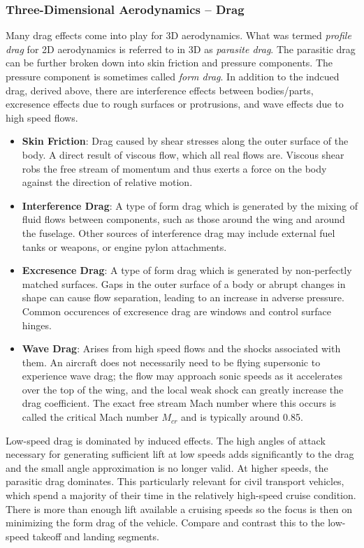 \documentclass[11pt]{article}
\newcommand{\Item}[1]{\item \textbf{#1}:}
\begin{document}
\subsubsection{Three-Dimensional Aerodynamics -- Drag}
Many drag effects come into play for 3D aerodynamics. What was termed \emph{profile drag} for 2D aerodynamics is referred to in 3D as \emph{parasite drag}. The parasitic drag can be further broken down into skin friction and pressure components. The pressure component is sometimes called \emph{form drag}. In addition to the indcued drag, derived above, there are interference effects between bodies/parts, excresence effects due to rough surfaces or protrusions, and wave effects due to high speed flows.
\begin{itemize}
\Item{Skin Friction} Drag caused by shear stresses along the outer surface of the body. A direct result of viscous flow, which all real flows are. Viscous shear robs the free stream of momentum and thus exerts a force on the body against the direction of relative motion.
\Item{Interference Drag} A type of form drag which is generated by the mixing of fluid flows between components, such as those around the wing and around the fuselage. Other sources of interference drag may include external fuel tanks or weapons, or engine pylon attachments.
\Item{Excresence Drag} A type of form drag which is generated by non-perfectly matched surfaces. Gaps in the outer surface of a body or abrupt changes in shape can cause flow separation, leading to an increase in adverse pressure. Common occurences of excresence drag are windows and control surface hinges.
\Item{Wave Drag} Arises from high speed flows and the shocks associated with them. An aircraft does not necessarily need to be flying supersonic to experience wave drag; the flow may approach sonic speeds as it accelerates over the top of the wing, and the local weak shock can greatly increase the drag coefficient. The exact free stream Mach number where this occurs is called the critical Mach number $M_{cr}$ and is typically around 0.85.
\end{itemize}

Low-speed drag is dominated by induced effects. The high angles of attack necessary for generating sufficient lift at low speeds adds significantly to the drag and the small angle approximation is no longer valid. At higher speeds, the parasitic drag dominates. This particularly relevant for civil transport vehicles, which spend a majority of their time in the relatively high-speed cruise condition. There is more than enough lift available a cruising speeds so the focus is then on minimizing the form drag of the vehicle. Compare and contrast this to the low-speed takeoff and landing segments.\\
\end{document}
